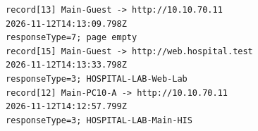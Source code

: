 \begin{Verbatim}[fontsize=\small,frame=single]
record[13] Main-Guest -> http://10.10.70.11
2026-11-12T14:13:09.798Z
responseType=7; page empty
record[15] Main-Guest -> http://web.hospital.test
2026-11-12T14:13:33.798Z
responseType=3; HOSPITAL-LAB-Web-Lab
record[12] Main-PC10-A -> http://10.10.70.11
2026-11-12T14:12:57.799Z
responseType=3; HOSPITAL-LAB-Main-HIS
\end{Verbatim}
